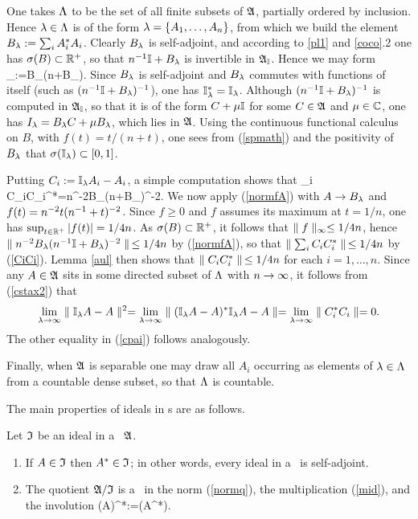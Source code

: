One takes $\Lambda$ to be the set of all finite subsets of ${\frak A}$, partially
ordered by inclusion.  Hence $\lambda\in\Lambda$ is of the form
$\lambda=\{A_1,\ldots,A_n\}$, from which we build the element
$B_{\lambda}:=\sum_i A_i^* A_i$. Clearly $B_{\lambda}$ is self-adjoint, and
according to \ref{pl1} and \ref{coco}.2 one has $\sigma(B)\subset{\Bbb R}^+$,
so that $n^{-1}{\Bbb I}+B_{\lambda}$ is invertible in ${\frak A}_{\Bbb I}$. Hence we may form
\be \I_{\lm}:=B_{\lm}(n\inv\I+B_{\lm})\inv.  \ee Since $B_{\lambda}$ is
self-adjoint and $B_{\lambda}$ commutes with functions of itself (such as
$(n^{-1}{\Bbb I}+B_{\lambda})^{-1}$), one has ${\Bbb I}_{\lambda}^*={\Bbb I}_{\lambda}$. Although
$(n^{-1}{\Bbb I}+B_{\lambda})^{-1}$ is computed in ${\frak A}_{\Bbb I}$, so that it is of the
form $C+\mu{\Bbb I}$ for some $C\in{\frak A}$ and $\mu\in{\Bbb C}$, one has
$I_{\lambda}=B_{\lambda}C+\mu B_{\lambda}$, which lies in ${\frak A}$.  Using the
continuous functional calculus on $B$, with $f(t)=t/(n+t)$, one sees
from (\ref{spmath}) and the positivity of $B_{\lambda}$ that
$\sigma({\Bbb I}_{\lambda})\subset [0,1]$.

Putting $C_i:={\Bbb I}_{\lambda}A_i-A_i$, a simple computation shows that \be
\sum_i C_iC_i^*=n^{-2}B_{\lm}(n\inv\I+B_{\lm})^{-2}.  \ee We
now apply (\ref{normfA}) with $A\rightarrow B_{\lambda}$ and $f(t)=n^{-2}t(n^{-1}
+t)^{-2}$.  Since $f\geq 0$ and $f$ assumes its maximum at $t=1/n$,
one has $\sup_{t\in{\Bbb R}^+} |f(t)|= 1/4n$. As $\sigma(B)\subset{\Bbb R}^+$, it
follows that $\parallel f\parallel_{\infty}\leq 1/4n$, hence $\parallel
n^{-2}B_{\lambda}(n^{-1}{\Bbb I}+B_{\lambda})^{-2}\parallel \,\leq 1/4n$ by (\ref{normfA}),
so that $\parallel \sum_i C_iC_i^*\parallel\,\leq 1/4n$ by (\ref{CiCi}). Lemma
\ref{aul} then shows that $\parallel C_iC_i^*\parallel\,\leq 1/4n$ for each
$i=1,\ldots, n$.  Since any $A\in{\frak A}$ sits in some directed subset of
$\Lambda$ with $n\rightarrow\infty$, it follows from (\ref{cstax2}) that
$$
\lim_{\lambda\rightarrow\infty}\parallel {\Bbb I}_{\lambda}A-A\parallel^2=\lim_{\lambda\rightarrow\infty}\parallel(
{\Bbb I}_{\lambda}A-A)^* {\Bbb I}_{\lambda}A-A\parallel =\lim_{\lambda\rightarrow\infty}\parallel C^*_iC_i\parallel=0.
$$
 The other equality in (\ref{cpai}) follows analogously.
 
Finally, when ${\frak A}$ is separable one may draw all $A_i$ occurring as
elements of $\lambda\in\Lambda$ from a countable dense subset, so that $\Lambda$
is countable.\enp

The main properties of ideals in \ca s are as follows.
\begin{Theorem}
Let ${\frak I}$ be an ideal in a \ca\ ${\frak A}$.
\begin{enumerate}
\item
If $A\in{\frak I}$ then $A^*\in{\frak I}$; in other words, every ideal in a \ca\
is self-adjoint.
\item
The quotient ${\frak A}/{\frak I}$ is a \ca\ in the norm (\ref{normq}), the
multiplication (\ref{mid}), and the involution \be
\ta(A)^*:=\ta(A^*).  \ee
\end{enumerate}\end{Theorem}

